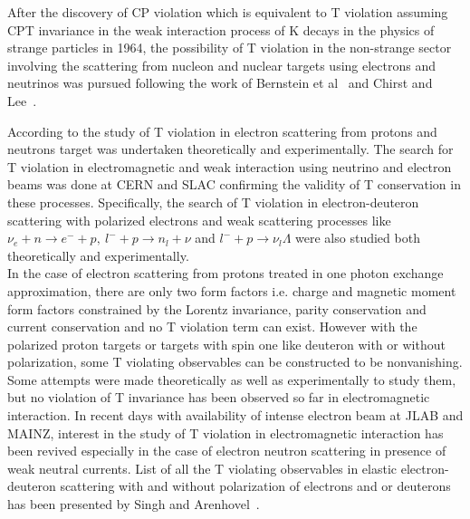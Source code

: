 After the discovery of CP violation which is equivalent to T violation assuming CPT invariance in the weak interaction process of K decays in the physics of strange particles in 1964, the possibility of T violation in the non-strange sector involving the scattering from nucleon and nuclear targets using electrons and neutrinos was pursued following the work of Bernstein et al~\cite{Bernstein:1965hj} and Chirst and Lee~\cite{Christ:1966zz}.

According to the study of T violation in electron scattering from protons and neutrons target was undertaken theoretically and experimentally. The search for T violation in electromagnetic and weak interaction using neutrino and  electron beams was done at CERN and SLAC confirming the validity of  T conservation in these processes. Specifically, the search of T violation in electron-deuteron scattering with polarized electrons and weak scattering processes like 
$\nu_e+n\rightarrow e^-+p, ~ l^-+p\rightarrow n_l+\nu$ and $ l^-+p\rightarrow \nu_l \Lambda$ were also studied both theoretically and experimentally. \\

In the case of electron scattering from protons treated in one photon exchange approximation, there are only two form factors i.e. charge and magnetic moment form factors constrained by the Lorentz invariance, parity conservation and current conservation and no T violation term can exist. However with the polarized proton targets or targets with spin one like deuteron with or without polarization, some T violating observables can be constructed to be nonvanishing. Some attempts were made theoretically as well as experimentally  to study them, but no violation of T invariance has been observed so far in electromagnetic interaction. In recent days with availability of intense electron beam at JLAB and MAINZ, interest in the study of T violation in electromagnetic interaction has been revived especially in the case of electron neutron scattering in presence of weak neutral currents. List of all the T violating observables in elastic electron-deuteron scattering with and without polarization of electrons and or deuterons has been presented by Singh and Arenhovel~\cite{Arenhovel:2000if}.\\

